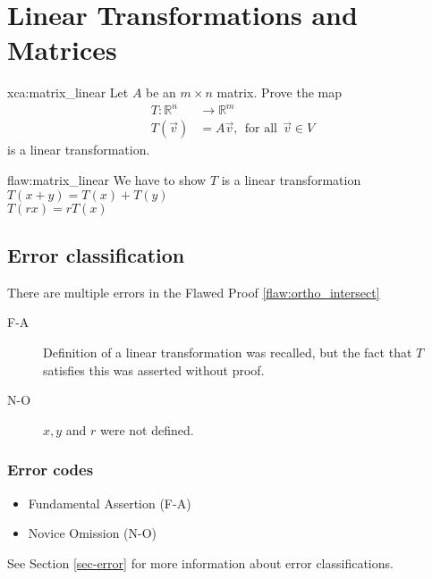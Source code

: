 \section{Linear Transformations and Matrices}

\begin{xca}{xca:matrix_linear}
Let $A$ be an $m\times n$ matrix. Prove the map
\begin{align*}
    T: \mathbb{R}^n &\to \mathbb{R}^m \\
    T(\vec{v})& = A\vec{v}, \:\:\text{for all} \:\: \vec{v} \in V
\end{align*}
is a linear transformation.
\end{xca}

\begin{flaw}{flaw:matrix_linear} %
We have to show $T$ is a linear transformation\\
$T(x+y) = T(x) + T(y) $\\
\noindent$T(rx) = rT(x) $
\end{flaw}

\clearpage
\subsection{Error classification}


There are multiple errors
 in the Flawed Proof \ref{flaw:ortho_intersect}

 \begin{description}
    \item[F-A] Definition of a linear transformation was recalled, but the fact that $T$ satisfies this was asserted without proof.
    \item[N-O] $x,y$ and $r$ were not defined.

 	
 \end{description}


\subsubsection{Error codes}
\begin{itemize}
    \item Fundamental Assertion (F-A)
    \item Novice Omission (N-O)
\end{itemize}
See Section \ref{sec-error} for more information about error classifications.

